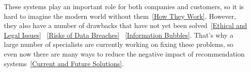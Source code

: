 \documentclass[10pt,twoside,slovak,a4paper]{article}
\begin{document}
These systems play an important role for both companies and customers, so it is hard to imagine the modern world without them~\ref{How They Work}. However, they also have a number of drawbacks that have not yet been solved~\ref{Ethical and Legal Issues} ~\ref{Risks of Data Breaches} ~\ref{Information Bubbles}. That's why a large number of specialists are currently working on fixing these problems, so even now there are many ways to reduce the negative impact of recommendation systems~\ref{Current and Future Solutions}. 



\newpage


\end{document}

